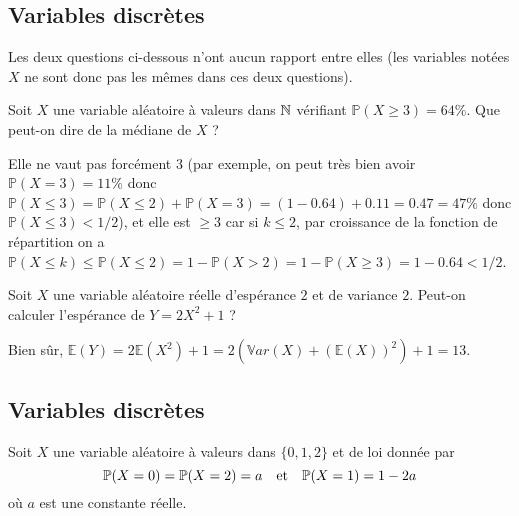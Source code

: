 \subsection{Variables discrètes}

Les deux questions ci-dessous n'ont aucun rapport entre elles (les variables notées $X$ ne sont donc pas les mêmes dans ces deux questions). 


\begin{question}
Soit $X$ une variable aléatoire à valeurs dans $\mathbb{N}$ vérifiant $\mathbb{P}(X\geq 3)=64\%$. Que peut-on dire de la médiane de $X$ ?
\begin{answers}
\end{answers}
\begin{explanations} 
Elle ne vaut pas forcément $3$ (par exemple, on peut très bien avoir $\mathbb{P}(X=3)=11\%$ donc $\mathbb{P}(X\leq 3)=\mathbb{P}(X\leq 2)+\mathbb{P}(X= 3)=(1-0.64)+0.11=0.47=47\%$ donc $\mathbb{P}(X\leq 3)<1/2$), et elle est $\geq 3$ car si $k\leq 2$, par croissance de la fonction de répartition on a  $\mathbb{P}(X\leq k) \leq \mathbb{P}(X\leq 2)= 1-\mathbb{P}(X>2) =1-\mathbb{P}(X\geq 3) = 1-0.64 < 1/2$. 
\end{explanations}
\end{question}


\begin{question}
Soit $X$ une variable aléatoire réelle d'espérance $2$ et de variance $2$. Peut-on calculer l'espérance de $Y=2X^2+1$ ?
\begin{answers}
\end{answers}
\begin{explanations} Bien sûr, $\mathbb{E}(Y)=2\mathbb{E}(X^2)+1=2(\mathbb{V}ar(X)+(\mathbb{E}(X))^2)+1 = 13$.
\end{explanations}
\end{question}



\subsection{Variables discrètes}

Soit $X$ une variable aléatoire à valeurs dans $\{0,1,2\}$ et de loi donnée  par
\[
 \mathbb{P}(X=0)=\mathbb{P}(X=2)=a \makebox[1.cm][c]{et} \mathbb{P}(X=1)=1-2a
\]
où $a$ est une constante réelle. 


